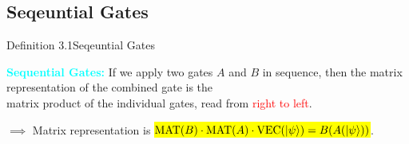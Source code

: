 \documentclass{book}
\begin{document}
\subsection{Seqeuntial Gates}
\begin{defBox}{Definition 3.1}{Seqeuntial Gates}
    \raggedright
    \textcolor{cyan}{\textbf{Sequential Gates:}} If we apply two gates $A$ and $B$ in sequence, then the matrix representation of the combined gate is the \\
    \hspace{3.2cm} matrix product of the individual gates, read from \textcolor{red}{right to left}.
    \begin{center}
    \end{center}
    $\implies$ Matrix representation is \hl{$\text{MAT}(B) \cdot \text{MAT}(A) \cdot \text{VEC}(\ket{\psi}) = B(A(\ket{\psi}))$}.
\end{defBox}
\end{document}
